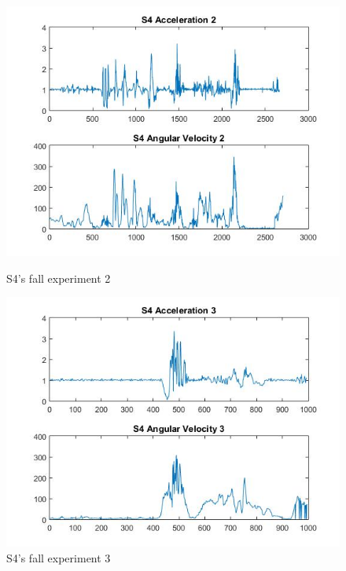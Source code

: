 \documentclass[letterpaper,12pt,titlepage,oneside,final]{book}
\begin{document}
\begin{figure}[h!]
	\centering
	\hspace{-1cm}
	\begin{minipage}[b]{0.5\textwidth}
		\centering
		\includegraphics[scale=0.42]{S4_2}
		\caption{S4's fall experiment 2}
	\end{minipage}%
	\hfill
	\begin{minipage}[b]{0.5\textwidth}
		\centering
		\includegraphics[scale=0.42]{S4_3}
		\caption{S4's fall experiment 3}
	\end{minipage}	
\end{figure}
\end{document}
